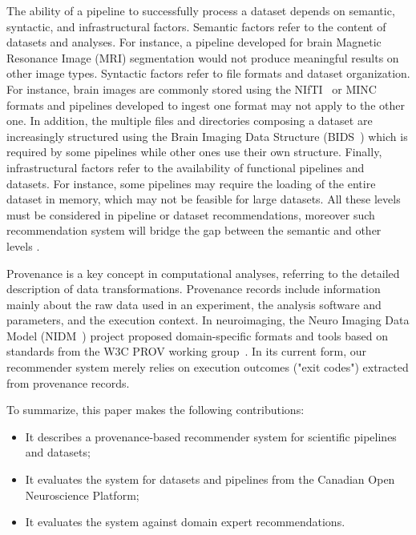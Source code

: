 \documentclass[conference]{IEEEtran}
\begin{document}
The ability of a pipeline to successfully process a dataset depends on
semantic, syntactic, and infrastructural factors. Semantic factors refer to
the content of datasets and analyses. For instance, a pipeline developed
for brain Magnetic Resonance Image (MRI) segmentation would not produce
meaningful results on other image types. Syntactic factors refer to file
formats and dataset organization. For instance, brain images are commonly
stored using the NIfTI~\cite{larobina2014medical} or
MINC~\cite{vincent2016minc} formats and pipelines developed to ingest one
format may not apply to the other one. In addition, the multiple files and
directories composing a dataset are increasingly structured using the Brain
Imaging Data Structure (BIDS~\cite{bids}) which is required by some
pipelines while other ones use their own structure. Finally,
infrastructural factors refer to the availability of functional pipelines
and datasets. For instance, some pipelines may require the loading of the
entire dataset in memory, which may not be feasible for large datasets. All
these levels must be considered in pipeline or dataset recommendations, moreover such recommendation system will bridge the gap between the semantic and other levels .

Provenance is a key concept in computational analyses, referring to the
detailed description of data transformations. Provenance records include
information mainly about the raw data used in an experiment, the analysis
software and parameters, and the execution context. In neuroimaging, the Neuro Imaging Data Model (NIDM~\cite{maumet2016sharing}) project proposed domain-specific
formats and tools based on standards from the W3C PROV working
group~\cite{missier2013w3c}. In its current form, our
recommender system merely relies on execution outcomes ("exit codes")
extracted from provenance records.

To summarize, this paper makes the following contributions:
\begin{itemize}
\item It describes a provenance-based recommender system for scientific
pipelines and datasets;
\item It evaluates the system for datasets and pipelines from the Canadian
Open Neuroscience Platform;
\item It evaluates the system against domain expert recommendations.
\end{itemize}

\end{document}
